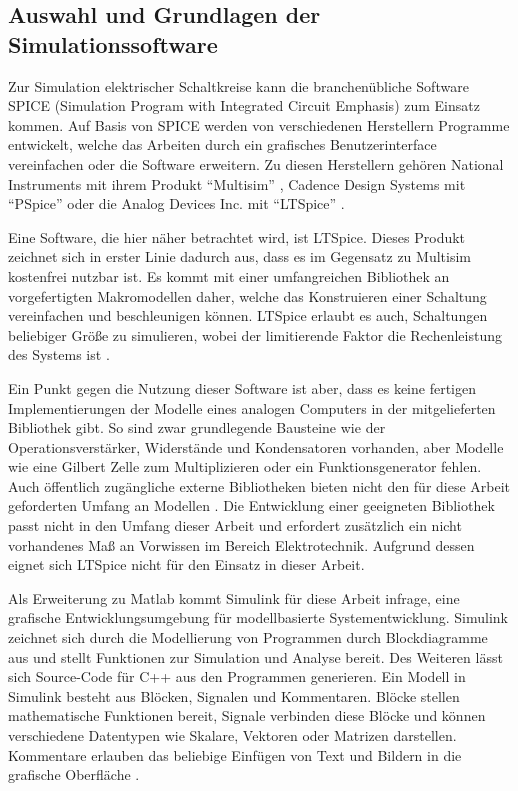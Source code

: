 \subsection{Auswahl und Grundlagen der Simulationssoftware}

Zur Simulation elektrischer Schaltkreise kann die branchenübliche Software SPICE (Simulation Program with Integrated Circuit Emphasis) zum Einsatz kommen. Auf Basis von SPICE werden von verschiedenen Herstellern Programme entwickelt, welche das Arbeiten durch \zbol ein grafisches Benutzerinterface vereinfachen oder die Software erweitern. Zu diesen Herstellern gehören \ua National Instruments mit ihrem Produkt "`Multisim"' \cite{NIMultisim}, Cadence Design Systems mit "`PSpice"' \cite{CadencePSpice} oder die Analog Devices Inc. mit "`LTSpice"' \cite{AnalogDevicesLTSpice}.

Eine Software, die hier näher betrachtet wird, ist LTSpice. Dieses Produkt zeichnet sich in erster Linie dadurch aus, dass es im Gegensatz zu \zbol Multisim kostenfrei nutzbar ist. Es kommt mit einer umfangreichen Bibliothek an vorgefertigten Makromodellen daher, welche das Konstruieren einer Schaltung vereinfachen und beschleunigen können. LTSpice erlaubt es auch, Schaltungen beliebiger Größe zu simulieren, wobei der limitierende Faktor die Rechenleistung des Systems ist \cite{Alonso2019}.

Ein Punkt gegen die Nutzung dieser Software ist aber, dass es keine fertigen Implementierungen der Modelle eines analogen Computers in der mitgelieferten Bibliothek gibt. So sind zwar grundlegende Bausteine wie der Operationsverstärker, Widerstände und Kondensatoren vorhanden, aber Modelle wie eine Gilbert Zelle zum Multiplizieren oder ein Funktionsgenerator fehlen. Auch öffentlich zugängliche externe Bibliotheken bieten nicht den für diese Arbeit geforderten Umfang an Modellen \cite[vgl.]{MaffeiLTSpiceAnalogComputer}. Die Entwicklung einer geeigneten Bibliothek passt nicht in den Umfang dieser Arbeit und erfordert zusätzlich ein nicht vorhandenes Maß an Vorwissen im Bereich Elektrotechnik. Aufgrund dessen eignet sich LTSpice nicht für den Einsatz in dieser Arbeit.

Als Erweiterung zu Matlab kommt Simulink für diese Arbeit infrage, eine grafische Entwicklungsumgebung für modellbasierte Systementwicklung. Simulink zeichnet sich durch die Modellierung von Programmen durch Blockdiagramme aus und stellt Funktionen zur Simulation und Analyse bereit. Des Weiteren lässt sich Source-Code für \zb C++ aus den Programmen generieren. Ein Modell in Simulink besteht aus Blöcken, Signalen und Kommentaren. Blöcke stellen mathematische Funktionen bereit, Signale verbinden diese Blöcke und können verschiedene Datentypen wie Skalare, Vektoren oder Matrizen darstellen. Kommentare erlauben das beliebige Einfügen von Text und Bildern in die grafische Oberfläche \cite{Peasley2018}.

